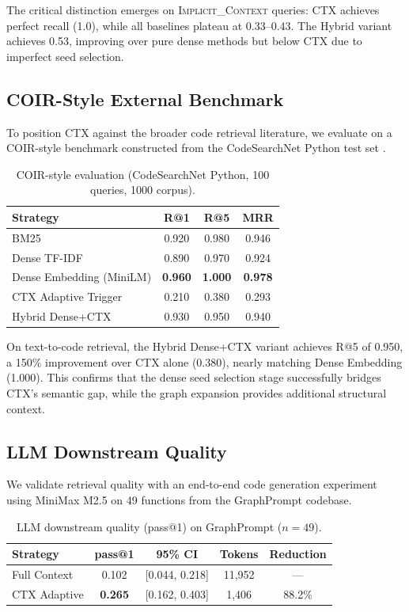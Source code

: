 \documentclass[11pt]{article}
\begin{document}
The critical distinction emerges on \textsc{Implicit\_Context} queries: CTX achieves perfect recall (1.0), while all baselines plateau at 0.33--0.43. The Hybrid variant achieves 0.53, improving over pure dense methods but below CTX due to imperfect seed selection.

\subsection{COIR-Style External Benchmark}

To position CTX against the broader code retrieval literature, we evaluate on a COIR-style benchmark constructed from the CodeSearchNet Python test set \citep{husain2019codesearchnet}.

\begin{table}[t]
\centering
\small
\caption{COIR-style evaluation (CodeSearchNet Python, 100 queries, 1000 corpus).}
\label{tab:coir}
\begin{tabular}{@{}lccc@{}}
\toprule
\textbf{Strategy} & \textbf{R@1} & \textbf{R@5} & \textbf{MRR} \\
\midrule
BM25 & 0.920 & 0.980 & 0.946 \\
Dense TF-IDF & 0.890 & 0.970 & 0.924 \\
Dense Embedding (MiniLM) & \textbf{0.960} & \textbf{1.000} & \textbf{0.978} \\
CTX Adaptive Trigger & 0.210 & 0.380 & 0.293 \\
Hybrid Dense+CTX & 0.930 & 0.950 & 0.940 \\
\bottomrule
\end{tabular}
\end{table}

On text-to-code retrieval, the Hybrid Dense+CTX variant achieves R@5 of 0.950, a 150\% improvement over CTX alone (0.380), nearly matching Dense Embedding (1.000). This confirms that the dense seed selection stage successfully bridges CTX's semantic gap, while the graph expansion provides additional structural context.

\subsection{LLM Downstream Quality}

We validate retrieval quality with an end-to-end code generation experiment using MiniMax M2.5 on 49 functions from the GraphPrompt codebase.

\begin{table}[t]
\centering
\small
\caption{LLM downstream quality (pass@1) on GraphPrompt ($n=49$).}
\label{tab:pass1}
\begin{tabular}{@{}lcccc@{}}
\toprule
\textbf{Strategy} & \textbf{pass@1} & \textbf{95\% CI} & \textbf{Tokens} & \textbf{Reduction} \\
\midrule
Full Context & 0.102 & [0.044, 0.218] & 11,952 & --- \\
CTX Adaptive & \textbf{0.265} & [0.162, 0.403] & 1,406 & 88.2\% \\
\bottomrule
\end{tabular}
\end{table}
\end{document}
